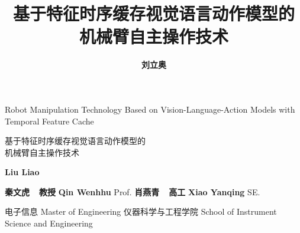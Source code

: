 \documentclass[engineer,fontset=windows,nocolorlinks]{seumasterthesis}
\begin{document}

\title
    {基于特征时序缓存视觉语言动作模型的\\机械臂自主操作技术}                                      %
    {}                                          %
    {Robot Manipulation Technology Based on Vision-Language-Action Models with Temporal Feature Cache}  %
    {}            %

\spine
    {基于特征时序缓存视觉语言动作模型的\\机械臂自主操作技术}      %
    {}                                                          %

\author
    {{\bfseries 刘立奥}}
    {{\bfseries Liu Liao}}

\advisor
    {{\bfseries 秦文虎~~教授 }}
    {{\bfseries Qin Wenhhu }}
    {Prof.}
\coadvisor
    {{\bfseries 肖燕青~~高工 }}
    {{\bfseries Xiao Yanqing }}
    {SE.}


\degreetype                     %
    {电子信息}
    {Master of Engineering}
\authorizedate{}      %
\department                     %
    {仪器科学与工程学院}
    {School of Instrument Science and Engineering}
\end{document}
